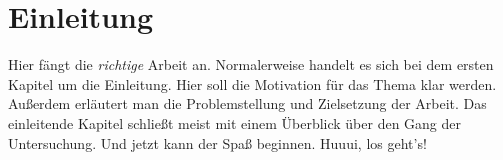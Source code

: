 
\chapter{Einleitung}
\label{chap:introduction}

Hier fängt die \textit{richtige} Arbeit an. Normalerweise handelt es sich bei dem ersten Kapitel um die Einleitung. Hier soll die Motivation für das Thema klar werden. Außerdem erläutert man die Problemstellung und Zielsetzung der Arbeit. Das einleitende Kapitel schließt meist mit einem Überblick über den Gang der Untersuchung. Und jetzt kann der Spaß beginnen. Huuui, los geht's!
